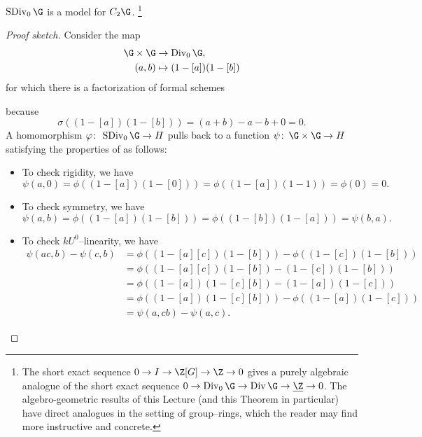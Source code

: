 \begin{theorem}\label{SDivModelsC2}
\(\SDiv_0 \G\) is a model for \(C_2 \G\).%
\footnote{%
The short exact sequence \(0 \to I \to \Z[G] \to \Z \to 0\) gives a purely algebraic analogue of the short exact sequence \(0 \to \Div_0 \G \to \Div \G \to \underline{\Z} \to 0\).
The algebro-geometric results of this Lecture (and this Theorem in particular) have direct analogues in the setting of group--rings, which the reader may find more instructive and concrete.
}
\end{theorem}
\begin{proof}[Proof sketch]
Consider the map
\begin{align*}
\G \times \G & \to \Div_0 \G, \\
(a, b) & \mapsto (1 - [a])(1 - [b])
\end{align*}
for which there is a factorization of formal schemes
\begin{center}
\end{center}
because \[\sigma((1 - [a])(1 - [b])) = (a + b) - a - b + 0 = 0.\]
A homomorphism \(\phi\co \SDiv_0 \G \to H\) pulls back to a function \(\psi\co \G \times \G \to H\) satisfying the properties of  as follows:
\begin{itemize}
    \item To check rigidity, we have \[\psi(a, 0) = \phi((1 - [a])(1 - [0])) = \phi((1 - [a])(1 - 1)) = \phi(0) = 0.\]
    \item To check symmetry, we have \[\psi(a, b) = \phi((1 - [a])(1 - [b])) = \phi((1 - [b])(1 - [a])) = \psi(b, a).\]
    \item To check \(kU^0\)--linearity, we have
    \begin{align*}
    \psi(ac, b) - \psi(c, b) & = \phi((1 - [a][c])(1 - [b])) - \phi((1 - [c])(1 - [b])) \\
    & = \phi((1 - [a][c])(1 - [b]) - (1 - [c])(1 - [b])) \\
    & = \phi((1 - [a])(1 - [c][b]) - (1 - [a])(1 - [c])) \\
    & = \phi((1 - [a])(1 - [c][b])) - \phi((1 - [a])(1 - [c])) \\
    & = \psi(a, cb) - \psi(a, c).
    \end{align*}
\end{itemize}


\end{proof}
